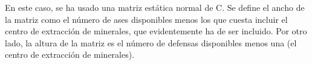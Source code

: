 En este caso, se ha usado una matriz estática normal de C. 
Se define el ancho de la matriz como el número de ases disponibles menos los que cuesta incluir el centro de extracción de minerales, que evidentemente ha de ser incluido.
Por otro lado, la altura de la matriz es el número de defensas disponibles menos una (el centro de extracción de minerales).
